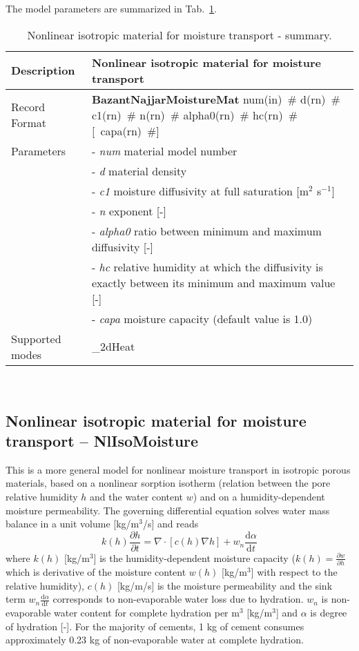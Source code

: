 \documentclass[a4paper]{article}
\newcommand{\descitem}[1]{{\noindent \bf #1}}
\newcommand{\elemparam}[2]{{{#1\tiny (#2)}~\#}}
\newcommand{\optelemparam}[2]{[{~\elemparam{#1}{#2}}]}
\newcommand{\param}[1]{{\it #1}}
\newcommand{\ud}{\mathrm{d}}
\newenvironment{mmt}{\begin{tabular}{|l|p{9cm}|}}{\end{tabular}\\}
\newenvironment{mmt}{\begin{tabular}{|l|l|}}{\end{tabular}\\}
\begin{document}
The model parameters are summarized in Tab.~\ref{BazantNajjarMoistureMat}.
\begin{table}[!htb]
\begin{mmt}
\hline
Description & Nonlinear isotropic material for moisture transport\\
\hline
Record Format & \descitem{BazantNajjarMoistureMat} \elemparam{num}{in}
\elemparam{d}{rn} \elemparam{c1}{rn} \elemparam{n}{rn}
\elemparam{alpha0}{rn} \elemparam{hc}{rn} \optelemparam{capa}{rn}\\
Parameters &- \param{num} material model number\\
&- \param{d} material density\\
&- \param{c1} moisture diffusivity at full saturation [m$^2$ s$^{-1}$]\\
&- \param{n} exponent [-]\\
&- \param{alpha0} ratio between minimum and maximum diffusivity [-]\\
&- \param{hc} relative humidity at which the diffusivity is exactly
between its minimum and maximum value [-] \\
&- \param{capa} moisture capacity (default value is 1.0)\\

Supported modes& \_2dHeat\\
\hline
\end{mmt}
\caption{Nonlinear isotropic material for moisture transport - summary.}
\label{BazantNajjarMoistureMat}
\end{table}



\subsection{Nonlinear isotropic material for moisture transport -- NlIsoMoisture}
\label{sec:NlIsoMoistureMat}
This is a more general model for nonlinear moisture transport in isotropic 
porous
materials, based on a nonlinear sorption isotherm (relation between 
the pore relative humidity $h$ and the water content $w$) 
and on a humidity-dependent
moisture permeability.
The governing differential equation solves water mass balance in a unit volume [kg/m$^3$/s] and reads
\begin{equation}\label{nlisomoisture:governing}
k(h) \frac{\partial h}{\partial t} = \nabla \cdot \left[ c(h) \nabla h \right] + w_n \frac{\ud \alpha}{\ud t}
\end{equation} 
where 
$k(h)$ [kg/m$^3$] is the humidity-dependent moisture capacity ($k(h)=\frac{\partial w}{\partial h}$ which is derivative of the moisture content $w(h)$ [kg/m$^3$] with respect to the relative humidity), $c(h)$
[kg/m/s] is the moisture permeability and the sink term 
$w_n \frac{\ud \alpha}{\ud t}$ corresponds to non-evaporable water loss due to hydration. $w_n$ is
non-evaporable water content for complete hydration per m$^3$ [kg/m$^3$] and $\alpha$ is degree of hydration [-]. 
For the majority of cements, 1 kg of cement consumes approximately 0.23 kg of non-evaporable water at complete hydration.
\end{document}
